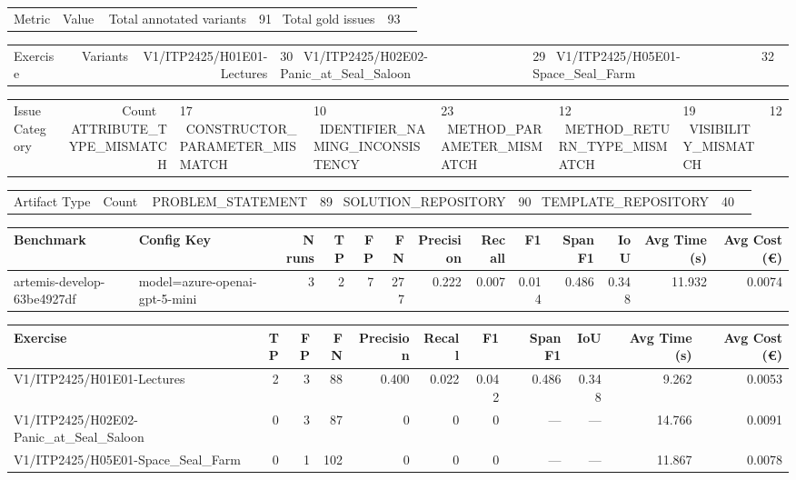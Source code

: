 \begin{tabular}{lr}
Metric & Value \
\hline
Total annotated variants & 91 \
Total gold issues & 93 \
\end{tabular}

\begin{tabular}{lr}
Exercise & Variants \
\hline
V1/ITP2425/H01E01-Lectures & 30 \
V1/ITP2425/H02E02-Panic\_at\_Seal\_Saloon & 29 \
V1/ITP2425/H05E01-Space\_Seal\_Farm & 32 \
\end{tabular}

\begin{tabular}{lr}
Issue Category & Count \
\hline
ATTRIBUTE\_TYPE\_MISMATCH & 17 \
CONSTRUCTOR\_PARAMETER\_MISMATCH & 10 \
IDENTIFIER\_NAMING\_INCONSISTENCY & 23 \
METHOD\_PARAMETER\_MISMATCH & 12 \
METHOD\_RETURN\_TYPE\_MISMATCH & 19 \
VISIBILITY\_MISMATCH & 12 \
\end{tabular}

\begin{tabular}{lr}
Artifact Type & Count \
\hline
PROBLEM\_STATEMENT & 89 \
SOLUTION\_REPOSITORY & 90 \
TEMPLATE\_REPOSITORY & 40 \
\end{tabular}

\begin{tabular}{llrrrrrrrrrrr}
Benchmark & Config Key & N runs & TP & FP & FN & Precision & Recall & F1 & Span F1 & IoU & Avg Time (s) & Avg Cost (€) \\
\hline
artemis-develop-63be4927df & model=azure-openai-gpt-5-mini & 3 & 2 & 7 & 277 & 0.222 & 0.007 & 0.014 & 0.486 & 0.348 & 11.932 & 0.0074 \\
\end{tabular}

\begin{tabular}{lrrrrrrrrrr}
Exercise & TP & FP & FN & Precision & Recall & F1 & Span F1 & IoU & Avg Time (s) & Avg Cost (€) \\
\hline
V1/ITP2425/H01E01-Lectures & 2 & 3 & 88 & 0.400 & 0.022 & 0.042 & 0.486 & 0.348 & 9.262 & 0.0053 \\
V1/ITP2425/H02E02-Panic\_at\_Seal\_Saloon & 0 & 3 & 87 & 0 & 0 & 0 & — & — & 14.766 & 0.0091 \\
V1/ITP2425/H05E01-Space\_Seal\_Farm & 0 & 1 & 102 & 0 & 0 & 0 & — & — & 11.867 & 0.0078 \\
\end{tabular}
